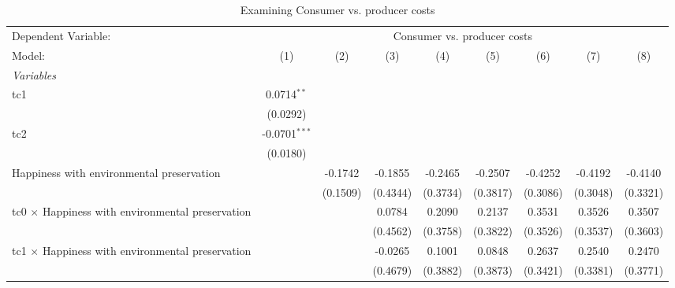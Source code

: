 
\begin{table}[htbp]
   \caption{Examining Consumer vs. producer costs}
   \centering
   \begin{tabular}{lcccccccc}
      \tabularnewline \midrule \midrule
      Dependent Variable: & \multicolumn{8}{c}{Consumer vs. producer costs}\\
      Model:                                                  & (1)             & (2)      & (3)      & (4)          & (5)          & (6)           & (7)          & (8)\\  
      \midrule
      \emph{Variables}\\
      tc1                                                     & 0.0714$^{**}$   &          &          &              &              &               &              &   \\   
                                                              & (0.0292)        &          &          &              &              &               &              &   \\   
      tc2                                                     & -0.0701$^{***}$ &          &          &              &              &               &              &   \\   
                                                              & (0.0180)        &          &          &              &              &               &              &   \\   
      Happiness with environmental preservation               &                 & -0.1742  & -0.1855  & -0.2465      & -0.2507      & -0.4252       & -0.4192      & -0.4140\\   
                                                              &                 & (0.1509) & (0.4344) & (0.3734)     & (0.3817)     & (0.3086)      & (0.3048)     & (0.3321)\\   
      tc0 $\times$ Happiness with environmental preservation  &                 &          & 0.0784   & 0.2090       & 0.2137       & 0.3531        & 0.3526       & 0.3507\\   
                                                              &                 &          & (0.4562) & (0.3758)     & (0.3822)     & (0.3526)      & (0.3537)     & (0.3603)\\   
      tc1 $\times$ Happiness with environmental preservation  &                 &          & -0.0265  & 0.1001       & 0.0848       & 0.2637        & 0.2540       & 0.2470\\   
                                                              &                 &          & (0.4679) & (0.3882)     & (0.3873)     & (0.3421)      & (0.3381)     & (0.3771)\\   

\end{tabular}
\end{table}
